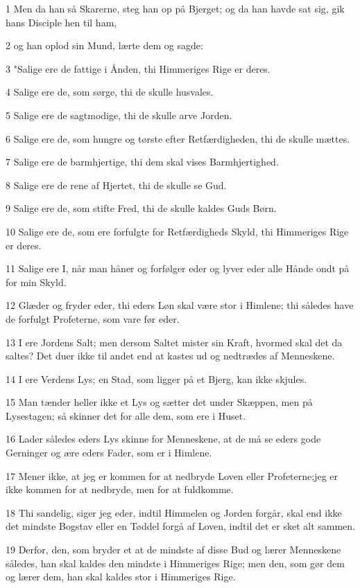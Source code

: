\par 1 Men da han så Skarerne, steg han op på Bjerget; og da han havde sat sig, gik hans Disciple hen til ham,
\par 2 og han oplod sin Mund, lærte dem og sagde:
\par 3 "Salige ere de fattige i Ånden, thi Himmeriges Rige er deres.
\par 4 Salige ere de, som sørge, thi de skulle husvales.
\par 5 Salige ere de sagtmodige, thi de skulle arve Jorden.
\par 6 Salige ere de, som hungre og tørste efter Retfærdigheden, thi de skulle mættes.
\par 7 Salige ere de barmhjertige, thi dem skal vises Barmhjertighed.
\par 8 Salige ere de rene af Hjertet, thi de skulle se Gud.
\par 9 Salige ere de, som stifte Fred, thi de skulle kaldes Guds Børn.
\par 10 Salige ere de, som ere forfulgte for Retfærdigheds Skyld, thi Himmeriges Rige er deres.
\par 11 Salige ere I, når man håner og forfølger eder og lyver eder alle Hånde ondt på for min Skyld.
\par 12 Glæder og fryder eder, thi eders Løn skal være stor i Himlene; thi således have de forfulgt Profeterne, som vare før eder.
\par 13 I ere Jordens Salt; men dersom Saltet mister sin Kraft, hvormed skal det da saltes? Det duer ikke til andet end at kastes ud og nedtrædes af Menneskene.
\par 14 I ere Verdens Lys; en Stad, som ligger på et Bjerg, kan ikke skjules.
\par 15 Man tænder heller ikke et Lys og sætter det under Skæppen, men på Lysestagen; så skinner det for alle dem, som ere i Huset.
\par 16 Lader således eders Lys skinne for Menneskene, at de må se eders gode Gerninger og ære eders Fader, som er i Himlene.
\par 17 Mener ikke, at jeg er kommen for at nedbryde Loven eller Profeterne;jeg er ikke kommen for at nedbryde, men for at fuldkomme.
\par 18 Thi sandelig, siger jeg eder, indtil Himmelen og Jorden forgår, skal end ikke det mindste Bogstav eller en Tøddel forgå af Loven, indtil det er sket alt sammen.
\par 19 Derfor, den, som bryder et at de mindste af disse Bud og lærer Menneskene således, han skal kaldes den mindste i Himmeriges Rige; men den, som gør dem og lærer dem, han skal kaldes stor i Himmeriges Rige.
